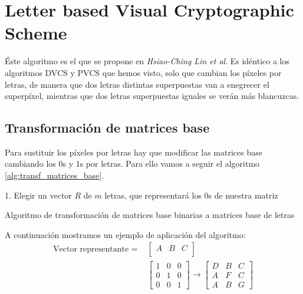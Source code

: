 \section[LVCS]{Letter based Visual Cryptographic Scheme}
Éste algoritmo es el que se propone en \textsl{Hsiao-Ching Lin et
al}\cite{articulo_base}. Es idéntico a los algoritmos DVCS y PVCS que hemos
visto, solo que cambian los píxeles por letras, de manera que dos letras
distintas superpuestas van a enegrecer el superpíxel, mientras que dos letras
superpuestas iguales se verán más blancuzcas.

\subsection{Transformación de matrices base}
Para sustituir los píxeles por letras hay que modificar las matrices base
cambiando los 0s y 1s por letras. Para ello vamos a seguir el algoritmo
\ref{alg:transf_matrices_base}.

\begin{algorithm}[H]

	1. Elegir un vector $R$ de $m$ letras, que representará los 0s de
	nuestra matriz

	\caption{Algoritmo de transformación de matrices base binarias a
	matrices base de letras}
	\label{alg:transf_matrices_base}
\end{algorithm}

A continuación mostramos un ejemplo de aplicación del algoritmo:
\begin{align}
	\nonumber
	\text{Vector representante = }
	&\begin{bmatrix}
		A & B & C\\
	\end{bmatrix}
	\\\nonumber
	&\begin{bmatrix}
		1 & 0 & 0\\
		0 & 1 & 0\\
		0 & 0 & 1
	\end{bmatrix}
	\rightarrow
	\begin{bmatrix}
		D & B & C\\
		A & F & C\\
		A & B & G
	\end{bmatrix}
\end{align}

